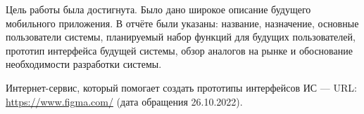 \documentclass[14pt]{extreport}
\begin{document}
\conclusions

Цель работы была достигнута. Было дано широкое описание будущего мобильного приложения. В отчёте были указаны: название, назначение, основные пользователи системы, планируемый набор функций для будущих пользователей, прототип интерфейса будущей системы, обзор аналогов на рынке и обоснование необходимости разработки системы.

\newpage
\begin{thebibliography}{99}

Интернет-сервис, который помогает создать прототипы интерфейсов ИС — URL: \url{https://www.figma.com/} (дата обращения 26.10.2022).	
	
\end{thebibliography}
\end{document}
